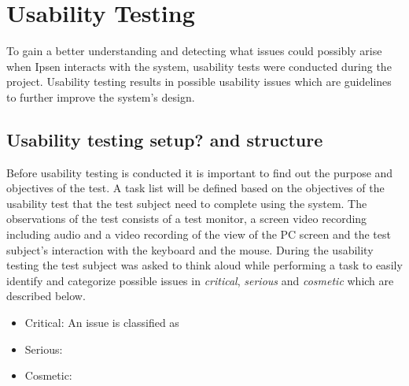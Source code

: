 \section{Usability Testing}

To gain a better understanding and detecting what issues could possibly arise when Ipsen interacts with the system, usability tests were conducted during the project. 
Usability testing results in possible usability issues which are guidelines to further improve the system's design. 

\subsection{Usability testing setup? and structure}
Before usability testing is conducted it is important to find out the purpose and objectives of the test. A task list will be defined based on the objectives of the usability test that the test subject need to complete using the system. The observations of the test consists of a test monitor, a screen video recording including audio and a video recording of the view of the PC screen and the test subject's interaction with the keyboard and the mouse. During the usability testing the test subject was asked to think aloud while performing a task to easily identify and categorize possible issues in \textit{critical}, \textit{serious} and \textit{cosmetic} which are described below.

\begin{itemize}
  \item Critical: An issue is classified as 
  \item Serious:
  \item Cosmetic: 
\end{itemize}



	 
  




